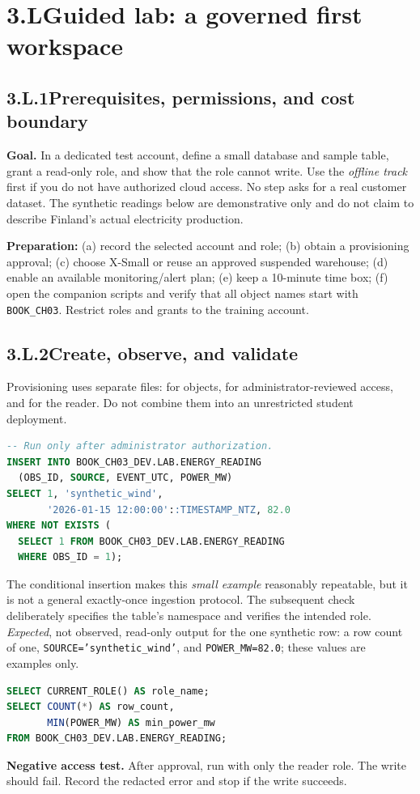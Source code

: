 \documentclass[11pt,twoside]{article}
\newcommand{\topic}[2]{\subsection*{#1\quad #2}}
\begin{document}
\newpage
\section*{3.L\quad Guided lab: a governed first workspace}
\topic{3.L.1}{Prerequisites, permissions, and cost boundary}
\textbf{Goal.} In a dedicated test account, define a small database and sample table, grant a read-only role, and show that the role cannot write. Use the \emph{offline track} first if you do not have authorized cloud access. No step asks for a real customer dataset. The synthetic readings below are demonstrative only and do not claim to describe Finland's actual electricity production.

\textbf{Preparation:} (a) record the selected account and role; (b) obtain a provisioning approval; (c) choose X-Small or reuse an approved suspended warehouse; (d) enable an available monitoring/alert plan; (e) keep a 10-minute time box; (f) open the companion scripts and verify that all object names start with \texttt{BOOK\_CH03}. Restrict roles and grants to the training account.

\topic{3.L.2}{Create, observe, and validate}
Provisioning uses separate files:  for objects,  for administrator-reviewed access, and  for the reader. Do not combine them into an unrestricted student deployment.

\begin{lstlisting}[language=SQL,caption={Selected rows from the standalone bootstrap lab; educational values only.}]
-- Run only after administrator authorization.
INSERT INTO BOOK_CH03_DEV.LAB.ENERGY_READING
  (OBS_ID, SOURCE, EVENT_UTC, POWER_MW)
SELECT 1, 'synthetic_wind',
       '2026-01-15 12:00:00'::TIMESTAMP_NTZ, 82.0
WHERE NOT EXISTS (
  SELECT 1 FROM BOOK_CH03_DEV.LAB.ENERGY_READING
  WHERE OBS_ID = 1);
\end{lstlisting}
The conditional insertion makes this \emph{small example} reasonably repeatable, but it is not a general exactly-once ingestion protocol. The subsequent check deliberately specifies the table's namespace and verifies the intended role. \emph{Expected}, not observed, read-only output for the one synthetic row: a row count of one, \texttt{SOURCE='synthetic\_wind'}, and \texttt{POWER\_MW=82.0}; these values are examples only.

\begin{lstlisting}[language=SQL,caption={Read-only verification excerpt.}]
SELECT CURRENT_ROLE() AS role_name;
SELECT COUNT(*) AS row_count,
       MIN(POWER_MW) AS min_power_mw
FROM BOOK_CH03_DEV.LAB.ENERGY_READING;
\end{lstlisting}
\textbf{Negative access test.} After approval, run  with only the reader role. The write should fail. Record the redacted error and stop if the write succeeds.
\end{document}
